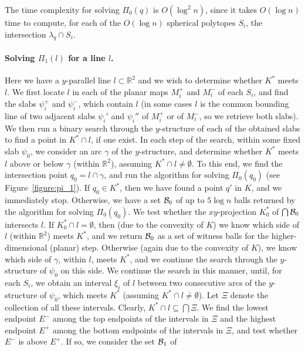 \documentclass[a4paper,12pt]{article}
\def\B{{\cal B}}
\begin{document}
The time complexity for solving $\Pi_0(q)$ is $O(\log^2 n)$, since
it takes $O(\log n)$ time to compute, for each of the $O(\log n)$
spherical polytopes $S_i$, the intersection $\lambda_q \cap S_i$.

\paragraph{\bf Solving $\Pi _1(l)$ for a line $l$.}
\label{subsec:Pi_1}
Here we have a $y$-parallel line $l \subset \mathbb{R}^2$ and we
wish to determine whether $K^*$ meets $l$. We first locate $l$ in
each of the planar maps $M_i^+$ and $M_i^-$ of each $S_i$, and find
the slabs $\psi_i^+$ and $\psi_i^-$, which contain $l$ (in some
cases $l$ is the common bounding line of two adjacent slabs
$\psi_i'$ and $\psi_i''$ of $M_i^+$ or of $M_i^-$, so we retrieve
both slabs). We then run a binary search through the $y$-structure
of each of the obtained slabs to find a point in $K^* \cap l$, if
one exist. In each step of the search, within some fixed slab
$\psi_0$, we consider an arc $\gamma$ of the $y$-structure, and
determine whether $K^*$ meets $l$ above or below $\gamma$ (within
$\mathbb{R}^2$), assuming $K^* \cap l \neq \emptyset$. To this end,
we find the intersection point $q_0 = l \cap \gamma$, and run the
algorithm for solving $\Pi_0(q_0)$ (see Figure~\ref{figure:pi_1}).
If $q_0 \in K^*$, then we have found a point $q'$ in $K$, and we
immediately stop. Otherwise, we have a set $\B_0$ of up to $5 \log
n$ balls returned by the algorithm for solving $\Pi_0(q_0)$. We test
whether the $xy$-projection $K_0^*$ of $\bigcap \B_0$ intersects
$l$. If $K_0^* \cap l = \emptyset$, then (due to the convexity of
$K$) we know which side of $l$ (within $\mathbb{R}^2$) meets $K^*$,
and we return $\B_0$ as a set of witness balls for the
higher-dimensional (planar) step. Otherwise (again due to the
convexity of $K$), we know which side of $\gamma$, within $l$, meets
$K^*$, and we continue the search through the $y$-structure of
$\psi_0$ on this side. We continue the search in this manner, until,
for each $S_i$, we obtain an interval $\xi_i$ of $l$ between two
consecutive arcs of the $y$-structure of $\psi_0$, which meets $K^*$
(assuming $K^* \cap l \neq \emptyset$). Let $\Xi$ denote the
collection of all these intervals. Clearly, $K^* \cap l \subseteq
\bigcap \Xi$. We find the lowest endpoint $E^-$ among the top
endpoints of the intervals in $\Xi$ and the highest endpoint $E^+$
among the bottom endpoints of the intervals in $\Xi$, and test
whether $E^-$ is above $E^+$. If so, we consider the set $\B_1$ of
\end{document}
